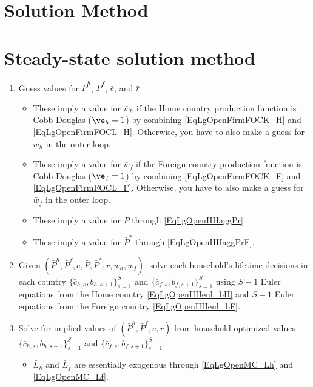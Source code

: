 \section{Solution Method}\label{SecLgOpenSol}


  \section{Steady-state solution method}\label{SecLgOpenSolSS}

    \begin{enumerate}
      \item Guess values for $\bar{P}^h$, $\bar{P}^f$, $\bar{e}$, and $\bar{r}$.
      \begin{itemize}
        \item These imply a value for $\bar{w}_h$ if the Home country production function is Cobb-Douglas ($\ve_h=1$) by combining \eqref{EqLgOpenFirmFOCK_H} and \eqref{EqLgOpenFirmFOCL_H}. Otherwise, you have to also make a guess for $\bar{w}_h$ in the outer loop.
        \item These imply a value for $\bar{w}_f$ if the Foreign country production function is Cobb-Douglas ($\ve_f=1$) by combining \eqref{EqLgOpenFirmFOCK_F} and \eqref{EqLgOpenFirmFOCL_F}. Otherwise, you have to also make a guess for $\bar{w}_f$ in the outer loop.
        \item These imply a value for $\bar{P}$ through \eqref{EqLgOpenHHaggPr}.
        \item These imply a value for $\bar{P}^*$ through \eqref{EqLgOpenHHaggPrF}.
      \end{itemize}
      \item Given $\left(\bar{P}^h, \bar{P}^f, \bar{e}, \bar{P}, \bar{P}^*, \bar{r}, \bar{w}_h, \bar{w}_f\right)$, solve each household's lifetime decisions in each country $\{\bar{c}_{h,s},\bar{b}_{h,s+1}\}_{s=1}^S$ and $\{\bar{c}_{f,s},\bar{b}_{f,s+1}\}_{s=1}^S$ using $S-1$ Euler equations from the Home country \eqref{EqLgOpenHHeul_bH} and $S-1$ Euler equations from the Foreign country \eqref{EqLgOpenHHeul_bF}.
      \item Solve for implied values of $\left(\bar{P}^h, \bar{P}^f, \bar{e}, \bar{r}\right)$ from household optimized values $\{\bar{c}_{h,s},\bar{b}_{h,s+1}\}_{s=1}^S$ and $\{\bar{c}_{f,s},\bar{b}_{f,s+1}\}_{s=1}^S$.
      \begin{itemize}
        \item $\bar{L}_h$ and $\bar{L}_f$ are essentially exogenous through \eqref{EqLgOpenMC_Lh} and \eqref{EqLgOpenMC_Lf}.

\end{itemize}
\end{enumerate}
